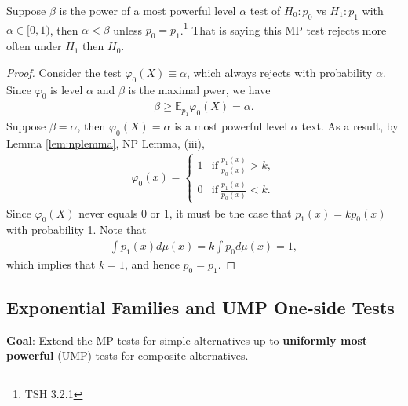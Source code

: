 \begin{corollary}
    Suppose $\beta$ is the power of a most powerful level $\alpha$ test of $H_0:p_0$ vs $H_1:p_1$ with $\alpha\in[0,1)$,
    then $\alpha<\beta$ unless $p_0=p_1$.\footnote{TSH 3.2.1}
    That is saying this MP test rejects more often under $H_1$ then $H_0$.
\end{corollary}
\begin{proof}
    Consider the test $\varphi_0(X)\equiv\alpha$, 
    which always rejects with probability $\alpha$.
    Since $\varphi_0$ is level $\alpha$ and $\beta$ is the maximal pwer, we have
    \begin{gather}
        \beta\geq\mathbb{E}_{p_1}\varphi_0(X)=\alpha.
    \end{gather}
    Suppose $\beta=\alpha$, then $\varphi_0(X)=\alpha$ is a most powerful level $\alpha$ text.
    As a result, by Lemma \ref{lem:nplemma}, NP Lemma, (iii),
    \begin{gather}
        \varphi_0(x)=\left\{\begin{array}{ll}
            1 & \text{if}~\frac{p_1(x)}{p_0(x)}>k, \\
            0 & \text{if}~\frac{p_1(x)}{p_0(x)}<k.
        \end{array}\right.
    \end{gather}
    Since $\varphi_0(X)$ never equals 0 or 1, 
    it must be the case that $p_1(x)=kp_0(x)$ with probability 1.
    Note that 
    \begin{gather}
        \int{p_1(x)}d\mu(x)=k\int{p_0}d\mu(x)=1,
    \end{gather}
    which implies that $k=1$, and hence $p_0=p_1$.
\end{proof}

\subsection{Exponential Families and UMP One-side Tests}

\textbf{Goal}: Extend the MP tests for simple alternatives up to 
\textbf{uniformly most powerful} (UMP) tests for composite alternatives.


